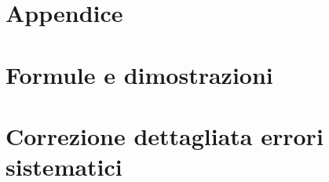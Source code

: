 \documentclass[12pt,a4paper]{article}
\begin{document}
  



\section*{Appendice}
  \appendix


\section{Formule e dimostrazioni}\label{sec:formule-e-dimostrazioni}

  


\section{Correzione dettagliata errori sistematici}\label{sec:correzione-dettagliata-errori-sistematici}

  
\end{document}
